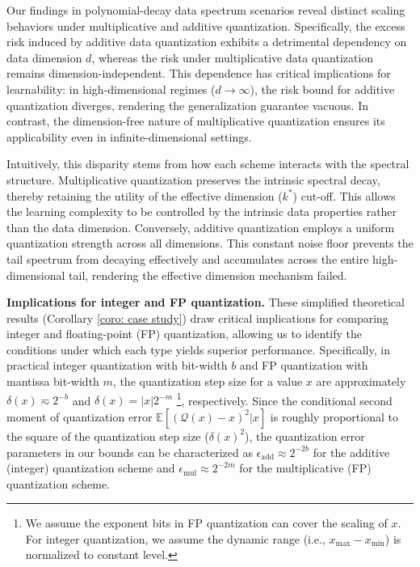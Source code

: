 \documentclass[11pt, letterpaper]{article}
\begin{document}
Our findings in polynomial-decay data spectrum scenarios reveal distinct scaling behaviors under multiplicative and additive quantization. Specifically, the excess risk induced by additive data quantization exhibits a detrimental dependency on data dimension $d$, whereas the risk under multiplicative data quantization remains dimension-independent. This dependence has critical implications for learnability: in high-dimensional regimes ($d \to \infty$), the risk bound for additive quantization diverges, rendering the generalization guarantee vacuous. In contrast, the dimension-free nature of multiplicative quantization ensures its applicability even in infinite-dimensional settings.

Intuitively, this disparity stems from how each scheme interacts with the spectral structure. Multiplicative quantization preserves the intrinsic spectral decay, thereby retaining the utility of the effective dimension ($k^*$) cut-off. This allows the learning complexity to be controlled by the intrinsic data properties rather than the data dimension. Conversely, additive quantization employs a uniform quantization strength across all dimensions. This constant noise floor prevents the tail spectrum from decaying effectively and accumulates across the entire high-dimensional tail, rendering the effective dimension mechanism failed.



\textbf{Implications for integer and FP quantization.} 
These simplified theoretical results (Corollary \ref{coro: case study}) draw critical implications for comparing integer and floating-point (FP) quantization, allowing us to identify the conditions under which each type yields superior performance. Specifically, in practical integer quantization with bit-width $b$ and FP quantization with mantissa bit-width $m$, the quantization step size for a value $x$ are approximately $\delta(x)\eqsim2^{-b}$ and $\delta(x)=|x|2^{-m}$ \footnote{We assume the exponent bits in FP quantization can cover the scaling of $x$. For integer quantization, we assume the dynamic range (i.e., $x_{\max}-x_{\min}$) is normalized to constant level.}, respectively. Since the conditional second moment of quantization error $\mathbb{E}[(\mathcal{Q}(x)-x)^2|x]$ is roughly proportional to the square of the quantization step size ($\delta(x)^2$), the quantization error parameters in our bounds can be characterized as $\epsilon_{\mathrm{add}} \approx 2^{-2b}$ for the additive (integer) quantization scheme and $\epsilon_{\mathrm{mul}} \approx 2^{-2m}$ for the multiplicative (FP) quantization scheme.
\end{document}
